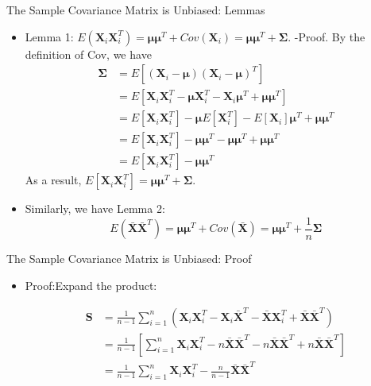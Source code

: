 \documentclass[
  ignorenonframetext,
]{beamer}
\providecommand{\tightlist}{%
  \setlength{\itemsep}{0pt}\setlength{\parskip}{0pt}}
\begin{document}
\begin{frame}{The Sample Covariance Matrix is Unbiased: Lemmas}
\protect\hypertarget{the-sample-covariance-matrix-is-unbiased-lemmas}{}
\begin{itemize}
\tightlist
\item
  Lemma 1:
  \(E(\mathbf X_i \mathbf X_i^T)= \boldsymbol \mu \boldsymbol \mu^T + Cov(\mathbf X_i)=\boldsymbol \mu \boldsymbol \mu^T + \boldsymbol \Sigma\).
  -Proof. By the definition of Cov, we have \[\begin{aligned}
  \boldsymbol \Sigma &=E[(\mathbf X_i-\boldsymbol \mu)(\mathbf X_i-\boldsymbol \mu)^T] \\
  &= E[\mathbf X_i \mathbf X_i^T - \boldsymbol \mu\mathbf X_i^T - \mathbf X_i \boldsymbol \mu^T + \boldsymbol \mu \boldsymbol \mu^T]\\
  &= E[\mathbf X_i \mathbf X_i^T] - \boldsymbol \mu E[\mathbf X_i^T] - E[\mathbf X_i] \boldsymbol \mu^T + \boldsymbol \mu \boldsymbol \mu^T\\
  &= E[\mathbf X_i \mathbf X_i^T] - \boldsymbol \mu \boldsymbol \mu^T - \boldsymbol \mu \boldsymbol \mu^T + \boldsymbol \mu \boldsymbol \mu^T\\
  &= E[\mathbf X_i \mathbf X_i^T] - \boldsymbol \mu \boldsymbol \mu^T
  \end{aligned}\] As a result,
  \(E[\mathbf X_i \mathbf X_i^T]= \boldsymbol \mu \boldsymbol \mu^T + \boldsymbol \Sigma\).
\item
  Similarly, we have Lemma 2:
  \[E(\bar {\mathbf X} \bar {\mathbf X}^T)=\boldsymbol \mu \boldsymbol \mu^T + Cov(\bar {\mathbf X})=\boldsymbol \mu \boldsymbol \mu^T + \frac{1}{n}\boldsymbol \Sigma\]
\end{itemize}
\end{frame}

\begin{frame}{The Sample Covariance Matrix is Unbiased: Proof}
\protect\hypertarget{the-sample-covariance-matrix-is-unbiased-proof}{}
\begin{itemize}
\item
  Proof:Expand the product:

  \[
  \begin{aligned}
  \mathbf{S} &= \frac{1}{n-1}\sum_{i=1}^n (\mathbf{X}_i \mathbf{X}_i^T - \mathbf{X}_i \bar{\mathbf{X}}^T - \bar{\mathbf{X}} \mathbf{X}_i^T + \bar{\mathbf{X}} \bar{\mathbf{X}}^T) \\
  &=\frac{1}{n-1}[\sum_{i=1}^n \mathbf{X}_i \mathbf{X}_i^T- n\bar{\mathbf X}\bar{\mathbf X}^T 
  -n\bar{\mathbf X}\bar{\mathbf X}^T + n\bar{\mathbf X}\bar{\mathbf X}^T]\\
  &= \frac{1}{n-1}\sum_{i=1}^n \mathbf{X}_i \mathbf{X}_i^T - \frac{n}{n-1}\bar{\mathbf{X}} \bar{\mathbf{X}}^T
  \end{aligned}
  \]
\end{itemize}
\end{frame}
\end{document}
